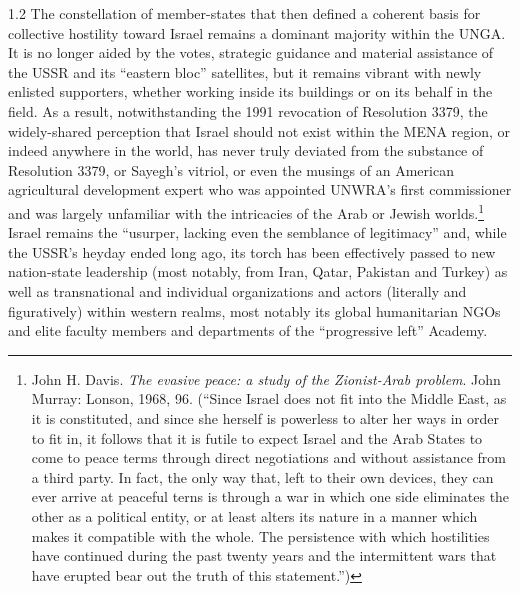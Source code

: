\documentclass[../unravbook.tex]{subfiles}
\begin{document}
\begin{spacing}{1.2}
The constellation of member-states that then defined a coherent basis for collective hostility toward Israel remains a dominant majority within the UNGA. It is no longer aided by the votes, strategic guidance and material assistance of the USSR and its ``eastern bloc'' satellites, but it remains vibrant with newly enlisted supporters, whether working inside its buildings or on its behalf in the field. As a result, notwithstanding the 1991 revocation of Resolution 3379, the widely-shared perception that Israel should not exist within the MENA region, or indeed anywhere in the world, has never truly deviated from the substance of Resolution 3379, or Sayegh's vitriol, or even the musings of an American agricultural development expert who was appointed UNWRA's first commissioner and was largely unfamiliar with the intricacies of the Arab or Jewish worlds.\footnote{John H. Davis. \textit{The evasive peace: a study of the Zionist-Arab problem}. John Murray: Lonson, 1968, 96. (``Since Israel does not fit into the Middle East, as it is constituted, and since she herself is powerless to alter her ways in order to fit in, it follows that it is futile to expect Israel and the Arab States to come to peace terms through direct negotiations and without assistance from a third party. In fact, the only way that, left to their own devices, they can ever arrive at peaceful terns is through a war in which one side eliminates the other as a political entity, or at least alters its nature in a manner which makes it compatible with the whole. The persistence with which hostilities have continued during the past twenty years and the intermittent wars that have erupted bear out the truth of this statement.'')} Israel remains the ``usurper, lacking even the semblance of legitimacy'' \parencite[49]{Sayegh-1965} and, while the USSR's heyday ended long ago, its torch has been effectively passed to new nation-state leadership (most notably, from Iran, Qatar, Pakistan and Turkey) as well as transnational and individual organizations and actors (literally and figuratively) within western realms, most notably its global humanitarian NGOs and elite faculty members and departments of the \enquote{progressive left} Academy.


\end{spacing}
\end{document}
